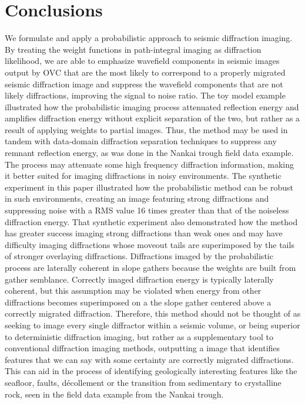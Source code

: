 \section{Conclusions}
We formulate and apply a probabilistic approach to seismic diffraction imaging.  By treating the weight functions in path-integral imaging as diffraction likelihood, we are able to emphasize wavefield components in seismic images output by OVC that are the most likely to correspond to a properly migrated seismic diffraction image and suppress the wavefield components that are not likely diffractions, improving the signal to noise ratio. The toy model example illustrated how the probabilistic imaging process attenuated reflection energy and amplifies diffraction energy without explicit separation of the two, but rather as a result of applying weights to partial images.  Thus, the method may be used in tandem with data-domain diffraction separation techniques to suppress any remnant reflection energy, as was done in the Nankai trough field data example.  The process may attenuate some high frequency diffraction information, making it better suited for imaging diffractions in noisy environments.  The synthetic experiment in this paper illustrated how the probabilistic method can be robust in such environments, creating an image featuring strong diffractions and suppressing noise with a RMS value 16 times greater than that of the noiseless diffraction energy.  That synthetic experiment also demonstrated how the method has greater success imaging strong diffractions than weak ones and may have difficulty imaging diffractions whose moveout tails are superimposed by the tails of stronger overlaying diffractions. Diffractions imaged by the probabilistic process are laterally coherent in slope gathers because the weights are built from gather semblance.  Correctly imaged diffraction energy is typically laterally coherent, but this assumption may be violated when energy from other diffractions becomes superimposed on a the slope gather centered above a correctly migrated diffraction.   Therefore, this method should not be thought of as seeking to image every single diffractor within a seismic volume, or being superior to deterministic diffraction imaging, but rather as a supplementary tool to conventional diffraction imaging methods, outputting a image that identifies features that we can say with some certainty are correctly migrated diffractions.  This can aid in the process of identifying geologically interesting features like the seafloor, faults, d\'ecollement or the transition from sedimentary to crystalline rock, seen in the field data example from the Nankai trough.  

